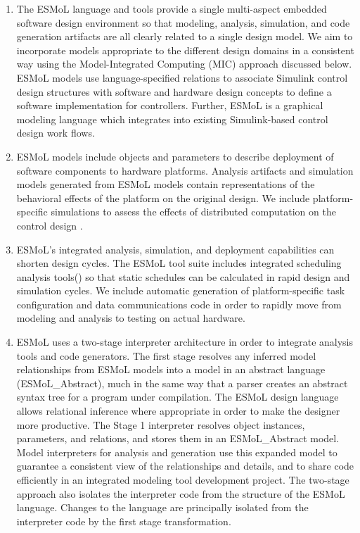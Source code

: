 \begin{enumerate}
 \item The ESMoL language and tools provide a single 
multi-aspect embedded software design environment 
so that modeling, analysis, 
simulation, and code generation artifacts are all 
clearly related to a single design model.  We aim to incorporate
models appropriate to the different design domains 
in a consistent way using the Model-Integrated Computing (MIC)
approach discussed below.
ESMoL models use language-specified relations to associate Simulink 
control design structures with
software and hardware design concepts to define a
software implementation for controllers.
Further, ESMoL is a graphical modeling language which integrates 
into existing Simulink-based control design work flows\cite{modeling:esmol}. 

 \item ESMoL models include objects and parameters 
to describe deployment of software components to 
hardware platforms.  Analysis artifacts and simulation 
models generated from ESMoL models contain 
representations of the behavioral effects of the 
platform on the original design.
We include platform-specific simulations to 
assess the effects of distributed computation on
the control design \cite{modeling:truetime}.

 \item ESMoL's integrated analysis, simulation, 
and deployment capabilities can shorten design cycles.
The ESMoL tool suite includes integrated scheduling analysis
tools(\cite{sched:analysis})
so that static schedules can be calculated in rapid design and
simulation cycles.  We include automatic generation of platform-specific
task configuration and data communications code in order to
rapidly move from modeling and analysis to testing on actual hardware.

 \item ESMoL uses a two-stage interpreter architecture 
in order to integrate analysis tools and code
generators.  The first stage resolves any inferred model 
relationships from ESMoL models into a model in 
an abstract language (ESMoL\_Abstract), much in the same 
way that a parser creates an abstract syntax tree 
for a program under compilation.  The ESMoL design language
allows relational inference where appropriate in order 
to make the designer more productive.  The Stage 1 
interpreter resolves object instances, parameters, and 
relations, and stores them in an ESMoL\_Abstract model.  
Model interpreters for analysis and generation use this 
expanded model to guarantee a consistent view of the 
relationships and details, and to share code efficiently 
in an integrated modeling tool development project.  The 
two-stage approach also isolates the interpreter code from 
the structure of the ESMoL language.  Changes to the 
language are principally isolated from the interpreter
code by the first stage transformation.


\end{enumerate}
